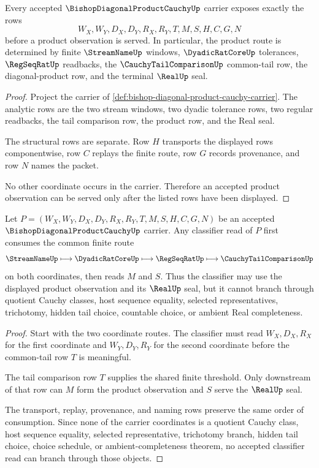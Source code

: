 \begin{theorem}
\label{thm:bishop-diagonal-product-cauchy-carrier}
Every accepted $\BishopDiagonalProductCauchyUp$ carrier exposes exactly the rows
$$
W_X,W_Y,D_X,D_Y,R_X,R_Y,T,M,S,H,C,G,N
$$
before a product observation is served. In particular, the product route is determined by finite $\StreamNameUp$ windows, $\DyadicRatCoreUp$ tolerances, $\RegSeqRatUp$ readbacks, the $\CauchyTailComparisonUp$ common-tail row, the diagonal-product row, and the terminal $\RealUp$ seal.
\end{theorem}
\begin{proof}
Project the carrier of \autoref{def:bishop-diagonal-product-cauchy-carrier}. The analytic rows are the two stream windows, two dyadic tolerance rows, two regular readbacks, the tail comparison row, the product row, and the Real seal.

The structural rows are separate. Row $H$ transports the displayed rows componentwise, row $C$ replays the finite route, row $G$ records provenance, and row $N$ names the packet.

No other coordinate occurs in the carrier. Therefore an accepted product observation can be served only after the listed rows have been displayed.
\end{proof}

\begin{theorem}
\label{thm:bishop-diagonal-product-cauchy-classifier}
Let $P=(W_X,W_Y,D_X,D_Y,R_X,R_Y,T,M,S,H,C,G,N)$ be an accepted $\BishopDiagonalProductCauchyUp$ carrier. Any classifier read of $P$ first consumes the common finite route
$$
\StreamNameUp \longmapsto
\DyadicRatCoreUp \longmapsto
\RegSeqRatUp \longmapsto
\CauchyTailComparisonUp
$$
on both coordinates, then reads $M$ and $S$. Thus the classifier may use the displayed product observation and its $\RealUp$ seal, but it cannot branch through quotient Cauchy classes, host sequence equality, selected representatives, trichotomy, hidden tail choice, countable choice, or ambient Real completeness.
\end{theorem}
\begin{proof}
Start with the two coordinate routes. The classifier must read $W_X,D_X,R_X$ for the first coordinate and $W_Y,D_Y,R_Y$ for the second coordinate before the common-tail row $T$ is meaningful.

The tail comparison row $T$ supplies the shared finite threshold. Only downstream of that row can $M$ form the product observation and $S$ serve the $\RealUp$ seal.

The transport, replay, provenance, and naming rows preserve the same order of consumption. Since none of the carrier coordinates is a quotient Cauchy class, host sequence equality, selected representative, trichotomy branch, hidden tail choice, choice schedule, or ambient-completeness theorem, no accepted classifier read can branch through those objects.
\end{proof}

